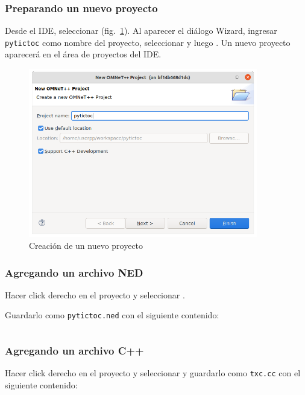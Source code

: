 \documentclass[]{article}
\begin{document}
\subsubsection{Preparando un nuevo proyecto}

Desde el IDE, seleccionar  (fig.~\ref{fig:new_project}). Al aparecer el diálogo Wizard, ingresar
\verb!pytictoc! como nombre del proyecto, seleccionar  y
luego . Un nuevo proyecto aparecerá en el área de proyectos del IDE.

\begin{figure}[h]
\caption{Creación de un nuevo proyecto}
\label{fig:new_project}
\centering
\includegraphics[width=10cm]{new_project}
\end{figure}

\subsubsection{Agregando un archivo NED}

Hacer click derecho en el proyecto y seleccionar .


Guardarlo como \verb!pytictoc.ned! con el siguiente contenido:

\inputminted{text}{codelistings/tictoc.ned}

\subsubsection{Agregando un archivo C++}

Hacer click derecho en el proyecto y seleccionar  y
guardarlo como \verb!txc.cc! con el siguiente contenido:
\end{document}

